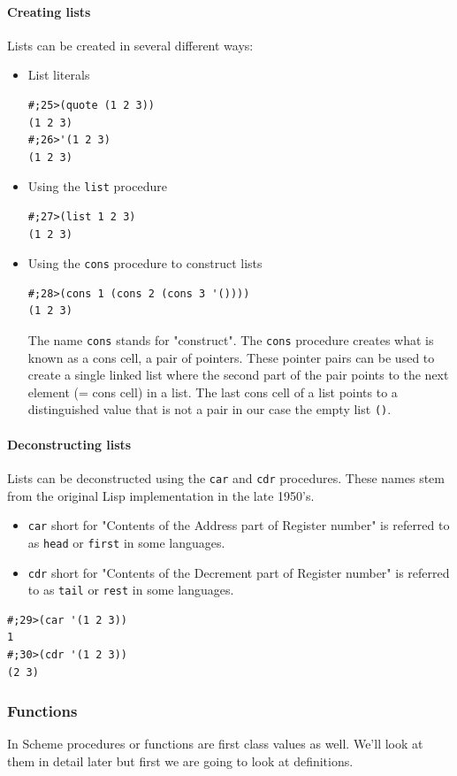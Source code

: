 \documentclass[12pt,a4paper,english,twoside]{article}
\begin{document}
\paragraph{Creating lists}
Lists can be created in several different ways:
\begin{itemize}
\item List literals \begin{lstlisting}
#;25>(quote (1 2 3))
(1 2 3)
#;26>'(1 2 3)
(1 2 3)
\end{lstlisting}
\item Using the \texttt{list} procedure
\begin{lstlisting}
#;27>(list 1 2 3)
(1 2 3)
\end{lstlisting}
\item Using the \texttt{cons} procedure to construct lists  \begin{lstlisting}
#;28>(cons 1 (cons 2 (cons 3 '())))
(1 2 3)
\end{lstlisting}
The name \texttt{cons} stands for "construct". The \texttt{cons} procedure 
creates what is known as a cons cell, a pair of pointers. These pointer pairs 
can be used to create a single linked list where the second part of the pair 
points to the next element (= cons cell) in a list. The last cons cell of a 
list points to a distinguished value that is not a pair in our case the empty 
list \texttt{()}.  \end{itemize}
\paragraph{Deconstructing lists}
Lists can be deconstructed using the \texttt{car} and \texttt{cdr} procedures. 
These names stem from the original Lisp implementation in the late 1950's.  
\begin{itemize}
\item \texttt{car} short for "Contents of the Address part of Register number" 
  is referred to as \texttt{head} or \texttt{first} in some languages.
\item \texttt{cdr} short for "Contents of the Decrement part of Register 
  number" is referred to as \texttt{tail} or \texttt{rest} in some languages.
\end{itemize} \begin{lstlisting}
#;29>(car '(1 2 3))
1
#;30>(cdr '(1 2 3))
(2 3)
\end{lstlisting}
\subsubsection{Functions}
In Scheme procedures or functions are first class values as well. We'll look at 
them in detail later but first we are going to look at definitions.
\end{document}
